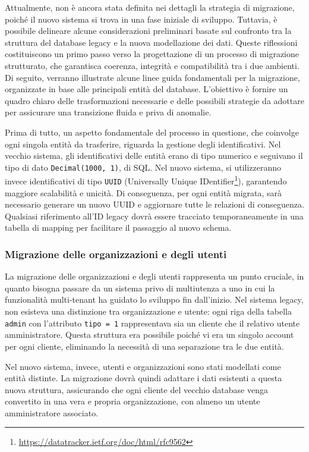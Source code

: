 Attualmente, non è ancora stata definita nei dettagli la strategia di migrazione, poiché il nuovo sistema si trova in una fase iniziale di sviluppo. Tuttavia, è possibile delineare alcune considerazioni preliminari basate sul confronto tra la struttura del database legacy e la nuova modellazione dei dati. Queste riflessioni costituiscono un primo passo verso la progettazione di un processo di migrazione strutturato, che garantisca coerenza, integrità e compatibilità tra i due ambienti. Di seguito, verranno illustrate alcune linee guida fondamentali per la migrazione, organizzate in base alle principali entità del database. L'obiettivo è fornire un quadro chiaro delle trasformazioni necessarie e delle possibili strategie da adottare per assicurare una transizione fluida e priva di anomalie.

Prima di tutto, un aspetto fondamentale del processo in questione, che coinvolge ogni singola entità da trasferire, riguarda la gestione degli identificativi. Nel vecchio sistema, gli identificativi delle entità erano di tipo numerico e seguivano il tipo di dato \texttt{Decimal(1000, 1)}, di SQL. Nel nuovo sistema, si utilizzeranno invece identificativi di tipo \texttt{UUID} (Universally Unique IDentifier\footnote{\url{https://datatracker.ietf.org/doc/html/rfc9562}}), garantendo maggiore scalabilità e unicità. Di conseguenza, per ogni entità migrata, sarà necessario generare un nuovo UUID e aggiornare tutte le relazioni di conseguenza. Qualsiasi riferimento all'ID legacy dovrà essere tracciato temporaneamente in una tabella di mapping per facilitare il passaggio al nuovo schema.

\subsubsection{Migrazione delle organizzazioni e degli utenti}
La migrazione delle organizzazioni e degli utenti rappresenta un punto cruciale, in quanto bisogna passare da un sistema privo di multiutenza a uno in cui la funzionalità multi-tenant ha guidato lo sviluppo fin dall’inizio. Nel sistema legacy, non esisteva una distinzione tra organizzazione e utente: ogni riga della tabella \texttt{admin} con l'attributo \texttt{tipo = 1} rappresentava sia un cliente che il relativo utente amministratore. Questa struttura era possibile poiché vi era un singolo account per ogni cliente, eliminando la necessità di una separazione tra le due entità.

Nel nuovo sistema, invece, utenti e organizzazioni sono stati modellati come entità distinte. La migrazione dovrà quindi adattare i dati esistenti a questa nuova struttura, assicurando che ogni cliente del vecchio database venga convertito in una vera e propria organizzazione, con almeno un utente amministratore associato.

